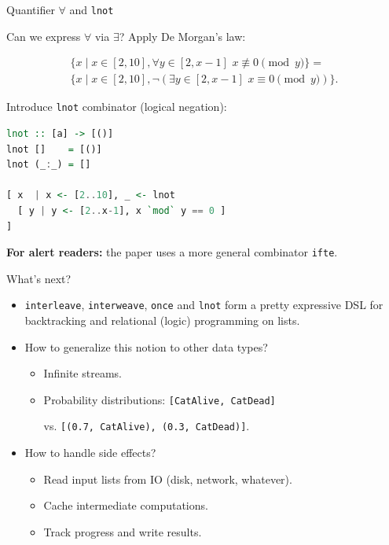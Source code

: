 \documentclass[handout]{beamer}
\begin{document}
\begin{frame}[fragile]{Quantifier $\forall$ and {\tt lnot}}

Can we express $\forall$ via $\exists$? Apply De Morgan's law:

\begin{multline*}
\bigl\{ x \mid x \in [2, 10], \forall y \in [2, x-1] \,\, x \not\equiv 0 \!\!\! \pmod y \bigr\} = \\
\bigl\{ x \mid x \in [2, 10], \neg (\exists y \in [2, x-1] \,\, x \equiv 0 \!\!\! \pmod y) \bigr\}.
\end{multline*}

\pause

Introduce {\tt lnot} combinator (logical negation):

\begin{lstlisting}[language=Haskell]
lnot :: [a] -> [()]
lnot []    = [()]
lnot (_:_) = []

[ x  | x <- [2..10], _ <- lnot
  [ y | y <- [2..x-1], x `mod` y == 0 ]
]
\end{lstlisting}

{\bf For alert readers:} the paper uses a more general combinator {\tt ifte}.

\end{frame}

\begin{frame}{What's next?}

\begin{itemize}[<+->]
\item {\tt interleave}, {\tt interweave}, {\tt once} and {\tt lnot}
      form a pretty expressive DSL for backtracking and relational (logic) programming
      on lists.
\item How to generalize this notion to other data types?
\begin{itemize}
  \item Infinite streams.
  \item Probability distributions:
        {\tt [CatAlive, CatDead]} \par vs.
        {\tt [(0.7, CatAlive), (0.3, CatDead)]}.
\end{itemize}
\item How to handle side effects?
\begin{itemize}
  \item Read input lists from IO (disk, network, whatever).
  \item Cache intermediate computations.
  \item Track progress and write results.
\end{itemize}
\end{itemize}

\end{frame}
\end{document}

